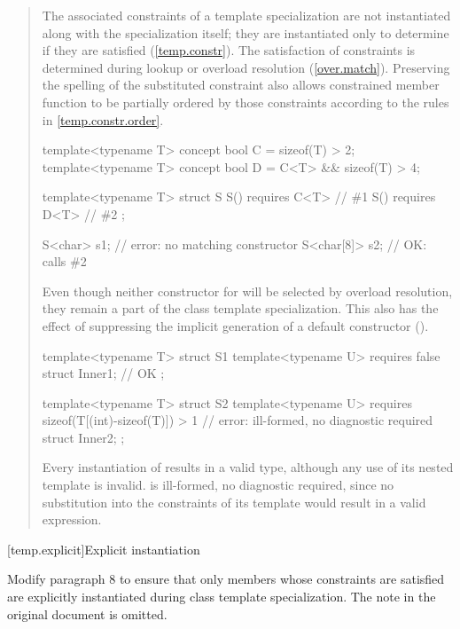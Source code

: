 \begin{quote}
\begin{addedblock}
\setcounter{Paras}{15}
\pnum
The associated constraints of a template specialization are not
instantiated along with the specialization itself; they are
instantiated only to determine if they are satisfied
(\ref{temp.constr}).
% 
\enternote
The satisfaction of constraints is determined during lookup or overload
resolution (\ref{over.match}). Preserving the spelling
of the substituted constraint also allows constrained member function
to be partially ordered by those constraints according to the rules
in \ref{temp.constr.order}.
\exitnote
% 
\enterexample
\begin{codeblock}
template<typename T> concept bool C = sizeof(T) > 2;
template<typename T> concept bool D = C<T> && sizeof(T) > 4;

template<typename T> struct S {
  S() requires C<T> { } // \#1
  S() requires D<T> { } // \#2
};

S<char> s1;    // error: no matching constructor
S<char[8]> s2; // OK: calls \#2
\end{codeblock}

Even though neither constructor for  will be selected by
overload resolution, they remain a part of the class template specialization. 
% 
This also has the effect of suppressing the implicit generation of a default
constructor ().
\exitexample

\enterexample
\begin{codeblock}
template<typename T> struct S1 {
  template<typename U> requires false struct Inner1; // OK
};

template<typename T> struct S2 {
  template<typename U> 
    requires sizeof(T[(int)-sizeof(T)]) > 1 // error: ill-formed, no diagnostic required
      struct Inner2;
};
\end{codeblock}
\exitexample
Every instantiation of  results in a valid type, although any use 
of its nested  template is invalid.
% 
 is ill-formed, no diagnostic required, since no substitution into 
the constraints of its  template would result in a valid 
expression.
\end{addedblock}
\end{quote}


[temp.explicit]{Explicit instantiation}

Modify paragraph 8 to ensure that only members whose constraints are 
satisfied are explicitly instantiated during class template 
specialization. The note in the original document is omitted.

